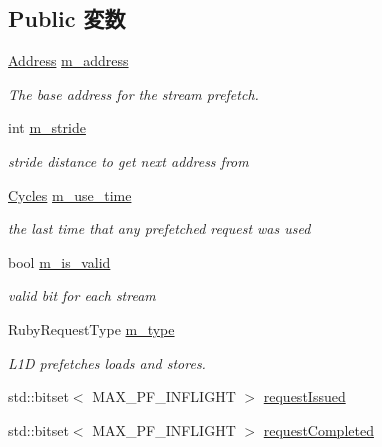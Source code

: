 \subsection*{Public 変数}
\begin{DoxyCompactItemize}
\item 
\hyperlink{classAddress}{Address} \hyperlink{classPrefetchEntry_a9fc76d7db60d4f05200f8248a697ea28}{m\_\-address}
\begin{DoxyCompactList}\small\item\em The base address for the stream prefetch. \item\end{DoxyCompactList}\item 
int \hyperlink{classPrefetchEntry_a8b3c2bb6e8f9ed6318723fb273cf6b5e}{m\_\-stride}
\begin{DoxyCompactList}\small\item\em stride distance to get next address from \item\end{DoxyCompactList}\item 
\hyperlink{classCycles}{Cycles} \hyperlink{classPrefetchEntry_a2f044fe87b9fd71df60401cbbb9b57f8}{m\_\-use\_\-time}
\begin{DoxyCompactList}\small\item\em the last time that any prefetched request was used \item\end{DoxyCompactList}\item 
bool \hyperlink{classPrefetchEntry_a3163252d457c8ef3a286a8538d7e319f}{m\_\-is\_\-valid}
\begin{DoxyCompactList}\small\item\em valid bit for each stream \item\end{DoxyCompactList}\item 
RubyRequestType \hyperlink{classPrefetchEntry_a7d010f0854d320898448eae2da5997f8}{m\_\-type}
\begin{DoxyCompactList}\small\item\em L1D prefetches loads and stores. \item\end{DoxyCompactList}\item 
std::bitset$<$ MAX\_\-PF\_\-INFLIGHT $>$ \hyperlink{classPrefetchEntry_a6b5dd4a5a1dcdda3d0d502f6658547a4}{requestIssued}
\item 
std::bitset$<$ MAX\_\-PF\_\-INFLIGHT $>$ \hyperlink{classPrefetchEntry_a341ad93f9c76b96f1e7c344829d846b4}{requestCompleted}
\end{DoxyCompactItemize}


